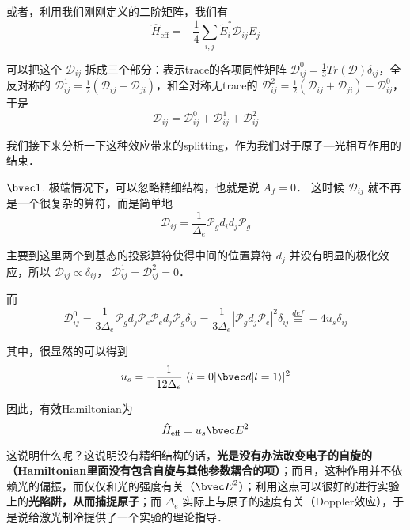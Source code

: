 或者，利用我们刚刚定义的二阶矩阵，我们有
\begin{equation}
\hat{H}_{\text{eff}} = -\frac{1}{4}\sum_{i,j} \tilde{E}_i^* \mathcal{D}_{ij} \tilde{E}_j
\end{equation}

可以把这个 $\mathcal{D}_{ij}$ 拆成三个部分：表示trace的各项同性矩阵 $\mathcal{D}_{ij}^0 = \frac{1}{3}Tr(\mathcal{D})\delta_{ij}$，全反对称的 $\mathcal{D}_{ij}^1 = \frac{1}{2}(\mathcal{D}_{ij} - \mathcal{D}_{ji})$，和全对称无trace的 $\mathcal{D}_{ij}^2 = \frac{1}{2}(\mathcal{D}_{ij} + \mathcal{D}_{ji}) - \mathcal{D}_{ij}^0$，于是
\begin{equation}
\mathcal{D}_{ij} = \mathcal{D}_{ij}^0 + \mathcal{D}_{ij}^1 + \mathcal{D}_{ij}^2
\end{equation}

我们接下来分析一下这种效应带来的splitting，作为我们对于原子—光相互作用的结束．

$\bvec 1$. 极端情况下，可以忽略精细结构，也就是说 $A_f = 0$． 这时候 $\mathcal{D}_{ij}$ 就不再是一个很复杂的算符，而是简单地
\begin{equation}
\mathcal{D}_{ij} = \frac{1}{\Delta_e}\mathcal{P}_g d_i d_j \mathcal{P}_g
\end{equation}

主要到这里两个到基态的投影算符使得中间的位置算符 $d_j$ 并没有明显的极化效应，所以 $\mathcal{D}_{ij} \propto \delta_{ij}$， $\mathcal{D}_{ij} ^1 = \mathcal{D}_{ij} ^2 = 0$．

而
\begin{equation}
\mathcal{D}_{ij}^0 = \frac{1}{3\Delta_e} \mathcal{P}_g d_j \mathcal{P}_e \mathcal{P}_e d_j \mathcal{P}_g \delta_{ij}= \frac{1}{3\Delta_e} |\mathcal{P}_g d_j \mathcal{P}_e|^2\delta_{ij}\overset{def}{\equiv} -4u_s \delta_{ij}
\end{equation}

其中，很显然的可以得到
\begin{equation}
u_s = -\frac{1}{12\Delta_e} |\langle l=0|{\bvec d}|l = 1\rangle|^2
\end{equation}

因此，有效Hamiltonian为
\begin{equation}
\hat{H}_{\text{eff}} = u_s {\bvec E}^2
\end{equation}

这说明什么呢？这说明没有精细结构的话，\textbf{光是没有办法改变电子的自旋的（Hamiltonian里面没有包含自旋与其他参数耦合的项）}；而且，这种作用并不依赖光的偏振，而仅仅和光的强度有关（${\bvec E}^2$）；利用这点可以很好的进行实验上的\textbf{光陷阱，从而捕捉原子}；而 $\Delta_e$ 实际上与原子的速度有关（Doppler效应），于是说给激光制冷提供了一个实验的理论指导．

